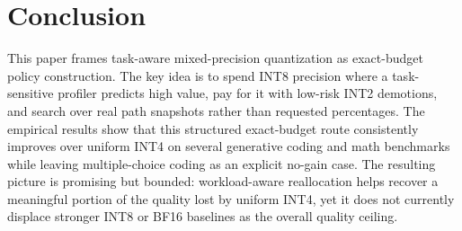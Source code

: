 \documentclass{article}
\newcommand{\inttwo}{INT2}
\newcommand{\intfour}{INT4}
\newcommand{\inteight}{INT8}
\begin{document}
\section{Conclusion}

This paper frames task-aware mixed-precision quantization as exact-budget policy construction. The key idea is to spend \inteight{} precision where a task-sensitive profiler predicts high value, pay for it with low-risk \inttwo{} demotions, and search over real path snapshots rather than requested percentages. The empirical results show that this structured exact-budget route consistently improves over uniform \intfour{} on several generative coding and math benchmarks while leaving multiple-choice coding as an explicit no-gain case. The resulting picture is promising but bounded: workload-aware reallocation helps recover a meaningful portion of the quality lost by uniform \intfour{}, yet it does not currently displace stronger \inteight{} or BF16 baselines as the overall quality ceiling.
\end{document}

